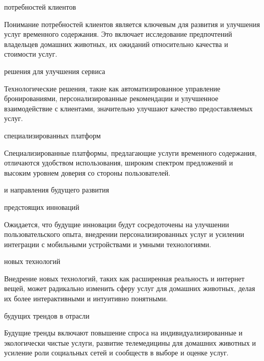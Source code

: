  потребностей клиентов

Понимание потребностей клиентов является ключевым для развития и улучшения услуг временного содержания. Это включает исследование предпочтений владельцев домашних животных, их ожиданий относительно качества и стоимости услуг.

 решения для улучшения сервиса

Технологические решения, такие как автоматизированное управление бронированиями, персонализированные рекомендации и улучшенное взаимодействие с клиентами, значительно улучшают качество предоставляемых услуг.

 специализированных платформ

Специализированные платформы, предлагающие услуги временного содержания, отличаются удобством использования, широким спектром предложений и высоким уровнем доверия со стороны пользователей.

 и направления будущего развития

 предстоящих инноваций

Ожидается, что будущие инновации будут сосредоточены на улучшении пользовательского опыта, внедрении персонализированных услуг и усилении интеграции с мобильными устройствами и умными технологиями.

 новых технологий

Внедрение новых технологий, таких как расширенная реальность и интернет вещей, может радикально изменить сферу услуг для домашних животных, делая их более интерактивными и интуитивно понятными.

 будущих трендов в отрасли

Будущие тренды включают повышение спроса на индивидуализированные и экологически чистые услуги, развитие телемедицины для домашних животных и усиление роли социальных сетей и сообществ в выборе и оценке услуг.
